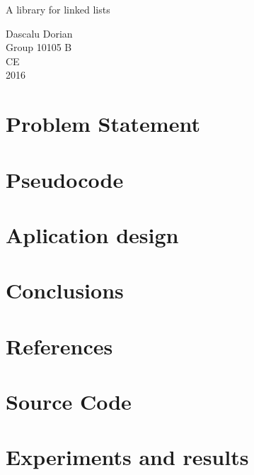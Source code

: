 \documentclass[oneside]{book}
\begin{document}

\begin{titlepage}
\vspace*{5cm}
\begin{center}
{\huge A library for linked lists}\\
\end{center}
\begin{flushright}
\vspace*{4cm}
{\LARGE Dascalu Dorian}\\
\vspace{1cm}
{\large Group 10105 B\\CE\\2016}
\end{flushright}
\end{titlepage}
\tableofcontents

\chapter{Problem Statement}

\chapter{Pseudocode}

\chapter{Aplication design}

\chapter{Conclusions}

\chapter{References}

\chapter{Source Code}

\chapter{Experiments and results}

\end{document}
